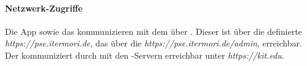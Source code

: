     \paragraph{Netzwerk-Zugriffe}
        Die App sowie das %
            kommunizieren mit dem %
            über %
            . Dieser ist über die definierte %
            \textit{https://pse.itermori.de},
        das %
            über die %
            \textit{https://pse.itermori.de/admin}, erreichbar. \\
        Der %
            kommuniziert durch %
            mit den %
            -Servern erreichbar unter \textit{https://kit.edu}.
